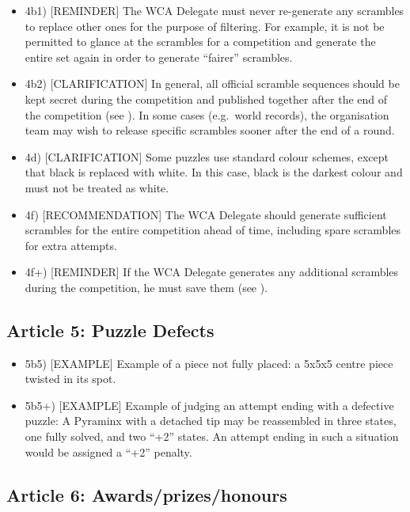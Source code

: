 \begin{itemize}
\item
  4b1) {[}REMINDER{]} The WCA Delegate must never re-generate any
  scrambles to replace other ones for the purpose of filtering. For
  example, it is not be permitted to glance at the scrambles for a
  competition and generate the entire set again in order to generate
  ``fairer'' scrambles.
\item
  4b2) {[}CLARIFICATION{]} In general, all official scramble sequences
  should be kept secret during the competition and published together
  after the end of the competition (see ). In some cases (e.g.~world
  records), the organisation team may wish to release specific scrambles
  sooner after the end of a round.
\item
  4d) {[}CLARIFICATION{]} Some puzzles use standard colour schemes,
  except that black is replaced with white. In this case, black is the
  darkest colour and must not be treated as white.
\item
  4f) {[}RECOMMENDATION{]} The WCA Delegate should generate sufficient
  scrambles for the entire competition ahead of time, including spare
  scrambles for extra attempts.
\item
  4f+) {[}REMINDER{]} If the WCA Delegate generates any additional
  scrambles during the competition, he must save them (see ).
\end{itemize}

\subsection{ Article 5: Puzzle Defects}

\begin{itemize}
\item
  5b5) {[}EXAMPLE{]} Example of a piece not fully placed: a 5x5x5 centre
  piece twisted in its spot.
\item
  5b5+) {[}EXAMPLE{]} Example of judging an attempt ending with a
  defective puzzle: A Pyraminx with a detached tip may be reassembled in
  three states, one fully solved, and two ``+2'' states. An attempt
  ending in such a situation would be assigned a ``+2'' penalty.
\end{itemize}

\subsection{ Article 6: Awards/prizes/honours}

